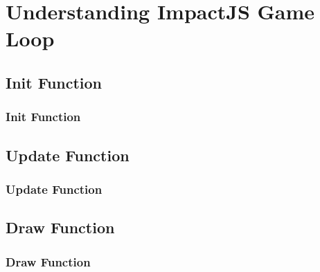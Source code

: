 \documentclass[red]{beamer}
\begin{document}
\section{Understanding ImpactJS Game Loop}

\subsection{Init Function}

\begin{frame}
	\frametitle{Init Function}
		\lstll
\end{frame}

\subsection{Update Function}
\begin{frame}
	\frametitle{Update Function}
		\lstlll
\end{frame}

\subsection{Draw Function}
\begin{frame}
	\frametitle{Draw Function}
		\lstllll
\end{frame}
\end{document}
